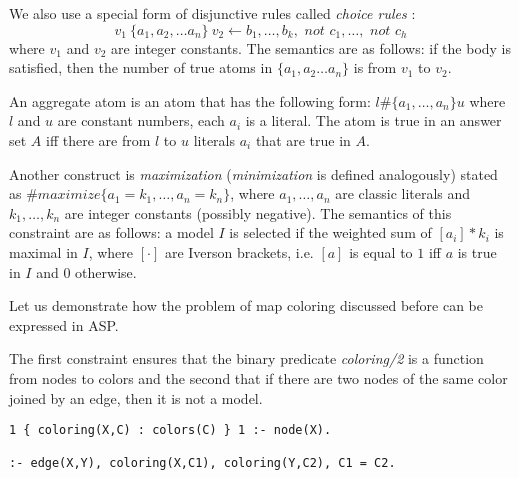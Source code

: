 We also use a special form of disjunctive rules called \textit{choice rules} \parencite{ASPbook}:
\begin{equation*}
  v_1~\{ a_1, a_2, \dots a_n \}~v_2 \leftarrow b_1, \dots, b_k, \textit{ not }c_1,\dots,\textit{ not }c_h
\end{equation*}
where $v_1$ and $v_2$ are integer constants. The semantics are as follows: if the body is satisfied, then the number of true atoms in $\{ a_1, a_2 \dots a_n \}$ is from $v_1$ to $v_2$.

An aggregate atom is an atom that has the following form: $l \# \{ a_1, \dots ,a_n \} u$
where $l$ and $u$ are constant numbers, each $a_i$ is a literal. The atom is true in an answer set $A$ iff there are from $l$ to $u$ literals $a_i$ that are true in $A$.

Another construct is \textit{maximization} \parencite{ASPbook, leone} (\textit{minimization} is defined analogously) stated as $\#\textit{maximize}\{ a_1=k_1, \dots, a_n=k_n \}$, 
where $a_1, \dots, a_n$ are classic literals and $k_1, \dots, k_n$ are integer constants (possibly negative). The semantics of this constraint are as follows: a model $I$ is selected if the weighted sum of $[a_i]*k_i$ is maximal in $I$, where $[\cdot]$ are Iverson brackets, i.e. $[a]$ is equal to $1$ iff $a$ is true in $I$ and $0$ otherwise.

\begin{example}
  Let us demonstrate how the problem of map coloring discussed before can be expressed in ASP. 

  The first constraint ensures that the binary predicate \textit{coloring/2} is a function from nodes to colors and the second that if there are two nodes of the same color joined by an edge, then it is not a model.
\begin{lstlisting}[caption=ASP encoding of map coloring constraints, label=lst:example_asp_coloring,basicstyle=\ttfamily]
1 { coloring(X,C) : colors(C) } 1 :- node(X).

:- edge(X,Y), coloring(X,C1), coloring(Y,C2), C1 = C2.
\end{lstlisting}
\end{example}


